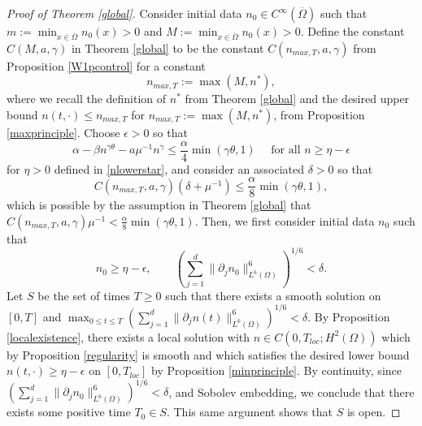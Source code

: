\documentclass[12pt]{article}
\theoremstyle{plain}
\begin{document}
\begin{proof}[Proof of Theorem \ref{global}]
Consider initial data $n_{0} \in C^{\infty}(\overline{\Omega})$ such that $m := \min_{x \in \overline{\Omega}} n_{0}(x) > 0$ and $M := \min_{x \in \overline{\Omega}} n_{0}(x) > 0$. Define the constant $C(M, a, \gamma)$ in Theorem \ref{global} to be the constant $C(n_{max, T}, a, \gamma)$ from Proposition \ref{W1pcontrol} for a constant 
\begin{equation*}
n_{max, T} := \max(M, n^{*}),
\end{equation*}
where we recall the definition of $n^{*}$ from Theorem \ref{global} and the desired upper bound $n(t, \cdot) \le n_{max, T}$ for $n_{max, T} := \max(M, n^{*})$, from Proposition \ref{maxprinciple}. Choose $\epsilon > 0$ so that 
\begin{equation*}
\alpha - \beta n^{\gamma \theta} - a \mu^{-1} n^{\gamma} \le \frac{\alpha}{4} \min(\gamma \theta, 1) \quad \text{ for all } n \ge \eta - \epsilon
\end{equation*}
for $\eta > 0$ defined in \eqref{nlowerstar}, and consider an associated $\delta > 0$ so that 
\begin{equation}\label{deltachoice}
C(n_{max, T}, a, \gamma)(\delta + \mu^{-1}) \le \frac{\alpha}{8}\min(\gamma \theta, 1),
\end{equation}
which is possible by the assumption in Theorem \ref{global} that $\displaystyle C(n_{max, T}, a, \gamma) \mu^{-1} < \frac{\alpha}{8}\min(\gamma \theta, 1)$. Then, we first consider initial data $n_{0}$ such that 
\begin{equation*}
n_{0} \ge \eta - \epsilon, \qquad \left(\sum_{j = 1}^{d} \|\partial_{j}n_{0}\|^{6}_{L^{6}(\Omega)}\right)^{1/6} < \delta.
\end{equation*}
Let $S$ be the set of times $T \ge 0$ such that there exists a smooth solution on $[0, T]$ and $\max_{0 \le t \le T} \left(\sum_{j = 1}^{d} \|\partial_{j}n(t)\|^{6}_{L^{6}(\Omega)}\right)^{1/6} < \delta$. By Proposition \ref{localexistence}, there exists a local solution with $n \in C(0, T_{loc}; H^{2}(\Omega))$ which by Proposition \ref{regularity} is smooth and which satisfies the desired lower bound $n(t, \cdot) \ge \eta - \epsilon$ on $[0, T_{loc}]$ by Proposition \ref{minprinciple}. By continuity, since $\left(\sum_{j = 1}^{d} \|\partial_{j}n_{0}\|_{L^{6}(\Omega)}^{6}\right)^{1/6} < \delta$, and Sobolev embedding, we conclude that there exists some positive time $T_{0} \in S$. This same argument shows that $S$ is open.


\end{proof}
\end{document}
